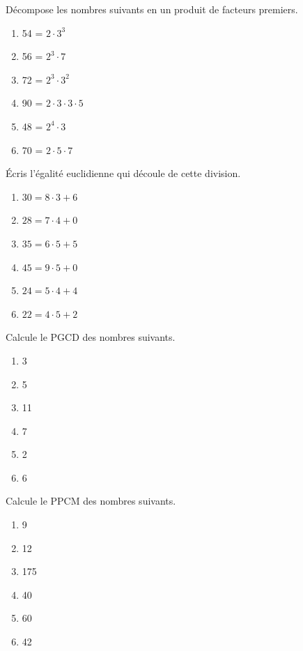 \documentclass[12pt,parskip=half-, twoside=semi]{scrartcl}
\begin{document}
\setcounter{exercise}{0}
    
    \begin{exercise}
      Décompose les nombres suivants en un produit de facteurs premiers.

          \begin{enumerate}[cols=3]
            \item 54 = $2 \cdot 3^3$
            \item 56 = $2^3 \cdot 7$
            \item 72 = $2^3 \cdot 3^2$
            \item 90 = $2 \cdot 3 \cdot 3 \cdot 5$
            \item 48 = $2^4 \cdot 3$
            \item 70 = $2 \cdot 5 \cdot 7$
          \end{enumerate}
    \end{exercise}
    
    
    \begin{exercise}
      Écris l'égalité euclidienne qui découle de cette
    division.
        \begin{enumerate}[cols=3]
          \item $30 = 8 \cdot 3 + 6$
          \item $28 = 7 \cdot 4 + 0$
          \item $35 = 6 \cdot 5 + 5$
          \item $45 = 9 \cdot 5 + 0$
          \item $24 = 5 \cdot 4 + 4$
          \item $22 = 4 \cdot 5 + 2$
        \end{enumerate}
    \end{exercise}
    
    \begin{exercise}
      Calcule le PGCD des nombres suivants.
        \begin{enumerate}[cols=3]
            \item 3
            \item 5
            \item 11
            \item 7
            \item 2
            \item 6
        \end{enumerate}
    \end{exercise}
    
    \begin{exercise}
      Calcule le PPCM des nombres suivants.
        \begin{enumerate}[cols=3]
            \item 9
            \item 12
            \item 175
            \item 40
            \item 60
            \item 42
        \end{enumerate}
    \end{exercise}
    
\end{document}
